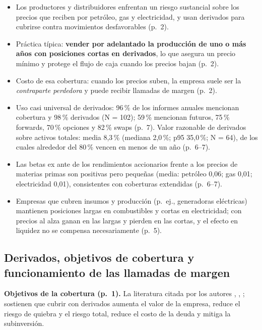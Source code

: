 \documentclass{article} %
\newcommand{\pg}[1]{(p.~#1)}
\begin{document}
        \begin{itemize}
            \item Los productores y distribuidores enfrentan un riesgo sustancial sobre los precios que reciben por petróleo, gas y electricidad, y usan derivados para cubrirse contra movimientos desfavorables \pg{2}.
            \item Práctica típica: \textbf{vender por adelantado la producción de uno o más años con posiciones cortas en derivados}, lo que asegura un precio mínimo y protege el flujo de caja cuando los precios bajan \pg{2}.
            \item Costo de esa cobertura: cuando los precios suben, la empresa suele ser la \emph{contraparte perdedora} y puede recibir llamadas de margen \pg{2}.
            \item Uso casi universal de derivados: 96\,\% de los informes anuales mencionan cobertura y 98\,\% derivados (N = 102); 59\,\% mencionan futuros, 75\,\% forwards, 70\,\% opciones y 82\,\% swaps \pg{7}. Valor razonable de derivados sobre activos totales: media 8,3\,\% (mediana 2,0\,\%; p95 35,0\,\%; N = 64), de los cuales alrededor del 80\,\% vencen en menos de un año \pg{6--7}.
            \item Las betas ex ante de los rendimientos accionarios frente a los precios de materias primas son positivas pero pequeñas (media: petróleo 0,06; gas 0,01; electricidad 0,01), consistentes con coberturas extendidas \pg{6--7}.
            \item Empresas que cubren insumos y producción (p.~ej., generadoras eléctricas) mantienen posiciones largas en combustibles y cortas en electricidad; con precios al alza ganan en las largas y pierden en las cortas, y el efecto en liquidez no se compensa necesariamente \pg{5}.
        \end{itemize}

    \subsection{Derivados, objetivos de cobertura y funcionamiento de las llamadas de margen}

        \textbf{Objetivos de la cobertura \pg{1}.} La literatura citada por los autores \textcite{Bartram_Brown_Conrad_2011}, \textcite{CHEN2014221}, \textcite{Gilje2017}; sostienen que cubrir con derivados aumenta el valor de la empresa, reduce el riesgo de quiebra y el riesgo total, reduce el costo de la deuda y mitiga la subinversión.
\end{document}
